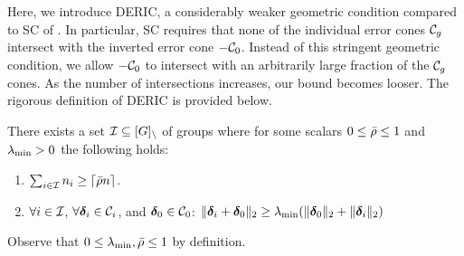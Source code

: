 %
%


Here, we introduce DERIC, a considerably weaker geometric condition compared to SC of \cite{guba16, mctr13}. In particular, SC requires that none of the individual error cones ${\cal C}_g$ intersect with the inverted error cone $-{\cal C}_0$.
Instead of this stringent geometric condition, we allow $-{\cal C}_0$ to intersect with an arbitrarily large fraction of the ${\cal C}_g$ cones.
As the number of intersections increases, our bound becomes looser.
The rigorous definition of DERIC is provided below.%
\begin{definition}  \label{incodef}
	There exists a set ${\cal I}\subseteq [G]_\setminus$ of groups where for some scalars $0\leq \bar{\rho}\leq 1$ and $\lambda_{\min}>0$ the following holds:
	\begin{enumerate}
		\item $\sum_{i\in {\cal I}} n_i\geq \lceil \bar{\rho} n\rceil$.
		\item $\forall i \in {\cal I}$, $\forall \boldsymbol{\delta}_i \in {\cal C}_i$, and $\boldsymbol{\delta}_0\in{\cal C}_0$: $\|\boldsymbol{\delta}_i+\boldsymbol{\delta}_0\|_{2}\geq \lambda_{\min} (\|\boldsymbol{\delta}_0\|_{2}+\|\boldsymbol{\delta}_i\|_{2})$
	\end{enumerate}
	Observe that $0\leq \lambda_{\min},\bar{\rho}\leq 1$ by definition.
\end{definition}



